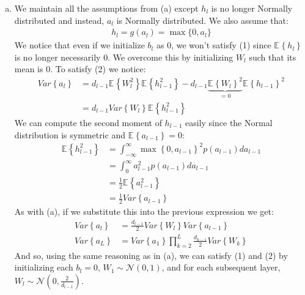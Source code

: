 \documentclass[paper=a4, fontsize=11pt]{scrartcl} %
\numberwithin{equation}{section} %
\numberwithin{figure}{section} %
\numberwithin{table}{section} %
\newcommand{\Ex}[2]{\mathbb{E}_{#1}\left\{#2\right\}}
\newcommand{\Var}[1]{Var\left\{#1\right\}}
\begin{document}
\begin{enumerate}[(a)]
	\item We maintain all the assumptions from (a) except $h_l$ is no longer Normally distributed and instead, $a_l$ is Normally distributed. We also assume that:
	\begin{align*}
	h_l = g(a_l) = \max\{0, a_l\}
	\end{align*}
	We notice that even if we initialize $b_l$ as $0$, we won't satisfy (1) since $\Ex{}{h_l}$ is no longer necessarily $0$. We overcome this by initializing $W_l$ such that its mean is $0$. To satisfy (2) we notice:
	\begin{align*}
	\Var{a_l} &=d_{l-1} \Ex{}{W_l^2}\Ex{}{h_{l-1}^2} - d_{l-1} \underbrace{\Ex{}{W_l}^2}_{=0}\Ex{}{h_{l-1}}^2\\
	&= d_{l-1} \Var{W_l}\Ex{}{h_{l-1}^2}
	\end{align*}
	We can compute the second moment of $h_{l-1}$ easily since the Normal distribution is symmetric and $\Ex{}{a_{l-1}}=0$:
	\begin{align*}
	\Ex{}{h_{l-1}^2} &= \int_{-\infty}^{\infty} \max\left\{ 0, a_{l-1} \right\}^2 p(a_{l-1})da_{l-1}\\
	&= \int_{0}^{\infty} a_{l-1}^2 p(a_{l-1})da_{l-1}\\
	&=\frac{1}{2}\Ex{}{a_{l-1}^2}\\
	&= \frac{1}{2} \Var{a_{l-1}}
	\end{align*}
	As with (a), if we substitute this into the previous expression we get: 
	\begin{align*}
	\Var{a_l} &= \frac{d_{l-1}}{2} \Var{W_l}\Var{ a_{l-1}} \\
	\Var{a_L} &= \Var{ a_1} \prod_{k=2}^{L} \frac{d_{k-1}}{2} \Var{W_k}
	\end{align*}
	And so, using the same reasoning as in (a), we can satisfy (1) and (2) by initializing each $b_l=0$, $W_1\sim\mathcal{N}(0,1)$, and for each subsequent layer, $W_l\sim\mathcal{N}\left(0,\frac{2}{d_{l-1}}\right)$.
\end{enumerate}
\end{document}
